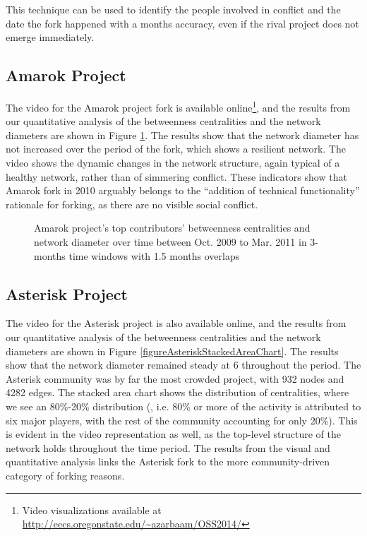 \documentclass[conference]{IEEEtran}
\begin{document}
This technique can be used to identify the people involved in conflict and the date the fork happened with a months accuracy, even if the rival project does not emerge immediately.\\

\subsection{Amarok Project}
The video for the Amarok project fork is available online\footnote{Video visualizations available at \href{http://eecs.oregonstate.edu/~azarbaam/OSS2014/}{http://eecs.oregonstate.edu/\textasciitilde azarbaam/OSS2014/}}, and the results from our quantitative analysis of the betweenness centralities and the network diameters are shown in Figure \ref{figureAmarokStachedAreaChart}. The results show that the network diameter has not increased over the period of the fork, which shows a resilient network. The video shows the dynamic changes in the network structure, again typical of a healthy network, rather than of simmering conflict. These indicators show that Amarok fork in 2010 arguably belongs to the ``addition of technical functionality'' rationale for forking, as there are no visible social conflict. \\

\begin{figure}[!Htbp]
\centering
{}
\justifying
{}
\caption{Amarok project's top contributors' betweenness centralities and network diameter over time between Oct. 2009 to Mar. 2011 in 3-months time windows with 1.5 months overlaps}
\label{figureAmarokStachedAreaChart}
\end{figure}

\subsection{Asterisk Project}
The video for the Asterisk project is also available online, and the results from our quantitative analysis of the betweenness centralities and the network diameters are shown in Figure \ref{figureAsteriskStackedAreaChart}. The results show that the network diameter remained steady at 6 throughout the period. The Asterisk community was by far the most crowded project, with 932 nodes and 4282 edges. The stacked area chart shows the distribution of centralities, where we see an 80\%-20\% distribution (, i.e. 80\% or more of the activity is attributed to six major players, with the rest of the community accounting for only 20\%). This is evident in the video representation as well, as the top-level structure of the network holds throughout the time period. The results from the visual and quantitative analysis links the Asterisk fork to the more community-driven category of forking reasons. \\
\end{document}
